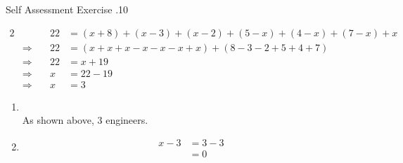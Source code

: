 \documentclass[../notes.tex]{subfiles}
\begin{document}
\begin{exercise}{Self Assessment Exercise \thechapter.10}
\begin{enumerate}
						\begin{alignat*}{2}
							& & 22 &= (x + 8) + (x - 3) + (x - 2) + (5 - x) + (4 - x) + (7 - x) + x\\
							& \Rightarrow \quad & 22 &= (x + x + x - x - x - x + x) + (8 - 3 - 2 + 5 + 4 + 7)\\
							& \Rightarrow \quad & 22 &= x + 19\\
							& \Rightarrow \quad & x &= 22 - 19\\
							& \Rightarrow \quad & x &= 3
						\end{alignat*}
						\begin{enumerate}
							\item {}\\
								As shown above, $3$ engineers.
							\item {}
								\begin{align*}
									x - 3 &= 3 - 3\\
									&= 0
								\end{align*}
						\end{enumerate}
					\end{enumerate}
				\end{exercise}
\end{document}
